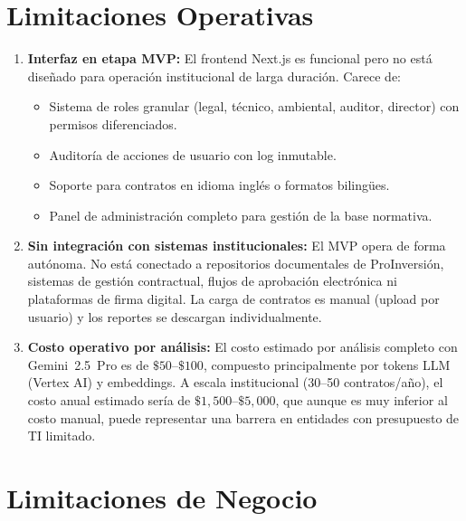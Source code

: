 \section*{Limitaciones Operativas}

\begin{enumerate}

    \item \textbf{Interfaz en etapa MVP:}
    El frontend Next.js es funcional pero no está diseñado para operación
    institucional de larga duración. Carece de:
    \begin{itemize}
        \item Sistema de roles granular (legal, técnico, ambiental, auditor,
              director) con permisos diferenciados.
        \item Auditoría de acciones de usuario con log inmutable.
        \item Soporte para contratos en idioma inglés o formatos bilingües.
        \item Panel de administración completo para gestión de la base
              normativa.
    \end{itemize}

    \item \textbf{Sin integración con sistemas institucionales:}
    El MVP opera de forma autónoma. No está conectado a repositorios
    documentales de ProInversión, sistemas de gestión contractual, flujos
    de aprobación electrónica ni plataformas de firma digital. La carga
    de contratos es manual (upload por usuario) y los reportes se
    descargan individualmente.

    \item \textbf{Costo operativo por análisis:}
    El costo estimado por análisis completo con Gemini~2.5~Pro es de
    $\$50$--$\$100$, compuesto principalmente por tokens LLM (Vertex AI)
    y embeddings. A escala institucional (30--50 contratos/año), el costo
    anual estimado sería de $\$1{,}500$--$\$5{,}000$, que aunque es muy
    inferior al costo manual, puede representar una barrera en entidades
    con presupuesto de TI limitado.

\end{enumerate}

\section*{Limitaciones de Negocio}

